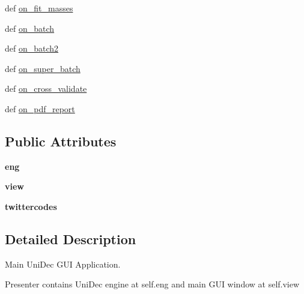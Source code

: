 \begin{DoxyCompactItemize}
\item 
def \hyperlink{class_uni_dec_1_1_g_uni_dec_1_1_uni_dec_app_ae7786790702270b0a6d3c89d966558f8}{on\+\_\+fit\+\_\+masses}
\item 
def \hyperlink{class_uni_dec_1_1_g_uni_dec_1_1_uni_dec_app_a628cf3842ec5ada6f5b60e5ea68c66b8}{on\+\_\+batch}
\item 
def \hyperlink{class_uni_dec_1_1_g_uni_dec_1_1_uni_dec_app_a1bfc387d15073c8dd2ff45c1ceb5fbaa}{on\+\_\+batch2}
\item 
def \hyperlink{class_uni_dec_1_1_g_uni_dec_1_1_uni_dec_app_a325dc08343153dfae4d945fb402fe2dd}{on\+\_\+super\+\_\+batch}
\item 
def \hyperlink{class_uni_dec_1_1_g_uni_dec_1_1_uni_dec_app_a34927e6b9052b8176a3f4d7fa77306d8}{on\+\_\+cross\+\_\+validate}
\item 
def \hyperlink{class_uni_dec_1_1_g_uni_dec_1_1_uni_dec_app_a30e994f3ae83494e6bf7d0d58f1fbf7b}{on\+\_\+pdf\+\_\+report}
\end{DoxyCompactItemize}
\subsection*{Public Attributes}
\begin{DoxyCompactItemize}
\item 
\hypertarget{class_uni_dec_1_1_g_uni_dec_1_1_uni_dec_app_a1f220c87c58eab43b0d4311165e26028}{}{\bfseries eng}\label{class_uni_dec_1_1_g_uni_dec_1_1_uni_dec_app_a1f220c87c58eab43b0d4311165e26028}

\item 
\hypertarget{class_uni_dec_1_1_g_uni_dec_1_1_uni_dec_app_afcd9db1e30556b34ac144e339e799df3}{}{\bfseries view}\label{class_uni_dec_1_1_g_uni_dec_1_1_uni_dec_app_afcd9db1e30556b34ac144e339e799df3}

\item 
\hypertarget{class_uni_dec_1_1_g_uni_dec_1_1_uni_dec_app_a0a18efbbf3628fb0ddec272376aca130}{}{\bfseries twittercodes}\label{class_uni_dec_1_1_g_uni_dec_1_1_uni_dec_app_a0a18efbbf3628fb0ddec272376aca130}

\end{DoxyCompactItemize}


\subsection{Detailed Description}
\begin{DoxyVerb}Main UniDec GUI Application.

Presenter contains UniDec engine at self.eng and main GUI window at self.view
\end{DoxyVerb}
 

